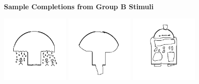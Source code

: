 \documentclass[../MA_Thesis.tex]{subfiles}
\begin{document}
\begin{appendix}
\begin{figure}[H]
\centering
\textbf{Sample Completions from Group B Stimuli}\par\medskip
\includegraphics[width=0.3\textwidth]{sample_completed_shapes/Group_2_Sample_1.png}
\includegraphics[width=0.3\textwidth]{sample_completed_shapes/Group_2_Sample_2.png}
\includegraphics[width=0.3\textwidth]{sample_completed_shapes/Group_2_Sample_3.png}
\end{figure}


\end{appendix}
\end{document}
